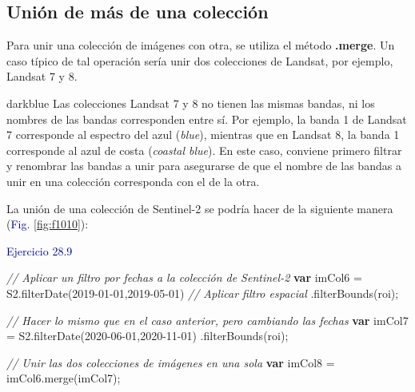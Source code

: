 \documentclass[
  12pt,
  letterpaper,
  twoside]{book}
\newenvironment{Shaded}{\begin{snugshade}}{\end{snugshade}}
\newcommand{\CommentTok}[1]{\textcolor[rgb]{0.24,0.58,0.00}{\textit{#1}}}
\newcommand{\ControlFlowTok}[1]{\textcolor[rgb]{0.00,0.00,0.00}{\textbf{#1}}}
\newcommand{\FunctionTok}[1]{\textcolor[rgb]{0.48,0.12,0.64}{#1}}
\newcommand{\NormalTok}[1]{#1}
\newcommand{\OperatorTok}[1]{\textcolor[rgb]{0.00,0.00,0.00}{#1}}
\newcommand{\StringTok}[1]{\textcolor[rgb]{0.87,0.29,0.22}{#1}}
\newcommand\boldpurple[1]{\textcolor{darkpurple}{\textbf{#1}}}
\begin{document}
\hypertarget{uniuxf3n-de-muxe1s-de-una-colecciuxf3n}{%
\subsection*{Unión de más de una colección}\label{uniuxf3n-de-muxe1s-de-una-colecciuxf3n}}

Para unir una colección de imágenes con otra, se utiliza el método \boldpurple{.merge}. Un caso típico de tal operación sería unir dos colecciones de Landsat, por ejemplo, Landsat 7 y 8.

\begin{bluebox2}

\begin{awesomeblock}{5pt}{\faLightbulb}{darkblue}
Las colecciones Landsat 7 y 8 no tienen las mismas bandas, ni los nombres de las bandas corresponden entre sí. Por ejemplo, la banda 1 de Landsat 7 corresponde al espectro del azul (\emph{blue}), mientras que en Landsat 8, la banda 1 corresponde al azul de costa (\emph{coastal blue}). En este caso, conviene primero filtrar y renombrar las bandas a unir para asegurarse de que el nombre de las bandas a unir en una colección corresponda con el de la otra.

\end{awesomeblock}

\end{bluebox2}

La unión de una colección de Sentinel-2 se podría hacer de la siguiente manera (\textcolor{darkblue}{Fig.} \ref{fig:f1010}):

\textcolor{darkblue}{Ejercicio 28.9}

\begin{Shaded}
\begin{Highlighting}[]
\CommentTok{// Aplicar un filtro por fechas a la colección de Sentinel{-}2}
\ControlFlowTok{var}\NormalTok{ imCol6 }\OperatorTok{=}\NormalTok{ S2}\OperatorTok{.}\FunctionTok{filterDate}\NormalTok{(}\StringTok{\textquotesingle{}2019{-}01{-}01\textquotesingle{}}\OperatorTok{,}\StringTok{\textquotesingle{}2019{-}05{-}01\textquotesingle{}}\NormalTok{)}
  \CommentTok{// Aplicar filtro espacial}
  \OperatorTok{.}\FunctionTok{filterBounds}\NormalTok{(roi)}\OperatorTok{;}

\CommentTok{// Hacer lo mismo que en el caso anterior, pero cambiando las fechas}
\ControlFlowTok{var}\NormalTok{ imCol7 }\OperatorTok{=}\NormalTok{ S2}\OperatorTok{.}\FunctionTok{filterDate}\NormalTok{(}\StringTok{\textquotesingle{}2020{-}06{-}01\textquotesingle{}}\OperatorTok{,}\StringTok{\textquotesingle{}2020{-}11{-}01\textquotesingle{}}\NormalTok{)}
  \OperatorTok{.}\FunctionTok{filterBounds}\NormalTok{(roi)}\OperatorTok{;}

\CommentTok{// Unir las dos colecciones de imágenes en una sola  }
\ControlFlowTok{var}\NormalTok{ imCol8 }\OperatorTok{=}\NormalTok{ imCol6}\OperatorTok{.}\FunctionTok{merge}\NormalTok{(imCol7)}\OperatorTok{;}
\end{Highlighting}
\end{Shaded}
\end{document}
